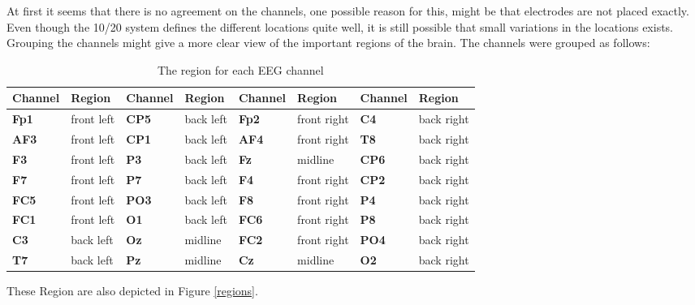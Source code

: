 At first it seems that there is no agreement on the channels, one possible reason for this, might be that electrodes are not placed exactly. Even though the 10/20 system defines the different locations quite well, it is still possible that small variations in the locations exists. Grouping the channels might give a more clear view of the important regions of the brain. The channels were grouped as follows: 
\begin{table}[H]
\centering
\begin{tabular}{ll|ll|ll|ll}
\textbf{Channel} & \textbf{Region} & \textbf{Channel} & \textbf{Region} & \textbf{Channel} & \textbf{Region}      & \textbf{Channel} & \textbf{Region}     \\ \hline
\textbf{Fp1}     & front left      & \textbf{CP5}     & back left       & \textbf{Fp2}     & front right & \textbf{C4}      & back right \\
\textbf{AF3}     & front left      & \textbf{CP1}     & back left       & \textbf{AF4}     & front right & \textbf{T8}      & back right \\
\textbf{F3}      & front left      & \textbf{P3}      & back left       & \textbf{Fz}      & midline     & \textbf{CP6}     & back right \\
\textbf{F7}      & front left      & \textbf{P7}      & back left       & \textbf{F4}      & front right & \textbf{CP2}     & back right \\
\textbf{FC5}     & front left      & \textbf{PO3}     & back left       & \textbf{F8}      & front right & \textbf{P4}      & back right \\
\textbf{FC1}     & front left      & \textbf{O1}      & back left       & \textbf{FC6}     & front right & \textbf{P8}      & back right \\
\textbf{C3}      & back left       & \textbf{Oz}      & midline         & \textbf{FC2}     & front right & \textbf{PO4}     & back right \\
\textbf{T7}      & back left       & \textbf{Pz}      & midline         & \textbf{Cz}      & midline     & \textbf{O2}      & back right
\end{tabular}
\caption{The region for each EEG channel}
\end{table}

These Region are also depicted in Figure \ref{regions}.

